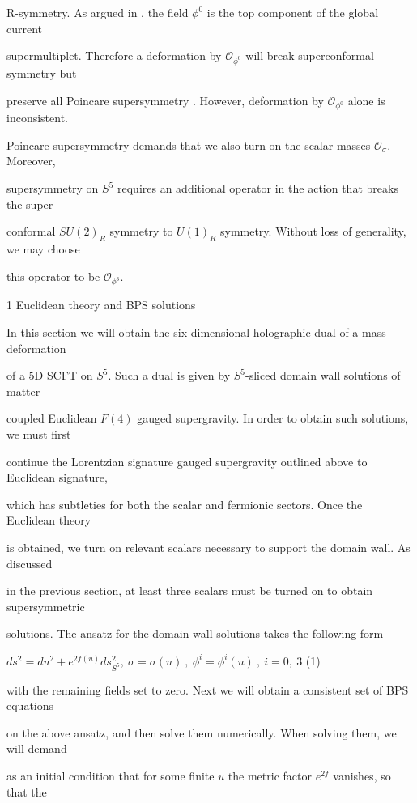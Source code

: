 \documentclass[a4paper,12pt]{article}
\begin{document}
$\mathrm{R}$-symmetry. As argued in , the field $\phi^{0}$ is the top component of the global current

supermultiplet. Therefore a deformation by $\mathcal{O}_{\phi^{0}}$ will break superconformal symmetry but

preserve all Poincare supersymmetry . However, deformation by $\mathcal{O}_{\phi^{0}}$ alone is inconsistent.

Poincare supersymmetry demands that we also turn on the scalar masses $\mathcal{O}_{\sigma}$. Moreover,

supersymmetry on $S^{5}$ requires an additional operator in the action that breaks the super-

conformal $SU(2)_{R}$ symmetry to $U(1)_{R}$ symmetry. Without loss of generality, we may choose

this operator to be $\mathcal{O}_{\phi^{3}}.$

1 Euclidean theory and BPS solutions

In this section we will obtain the six-dimensional holographic dual of a mass deformation

of a $5\mathrm{D}$ SCFT on $S^{5}$. Such a dual is given by $S^{5}$-sliced domain wall solutions of matter-

coupled Euclidean $F(4)$ gauged supergravity. In order to obtain such solutions, we must first

continue the Lorentzian signature gauged supergravity outlined above to Euclidean signature,

which has subtleties for both the scalar and fermionic sectors. Once the Euclidean theory

is obtained, we turn on relevant scalars necessary to support the domain wall. As discussed

in the previous section, at least three scalars must be turned on to obtain supersymmetric

solutions. The ansatz for the domain wall solutions takes the following form
\begin{center}
$ds^{2}=du^{2}+e^{2f(u)}ds_{S^{5}}^{2},\ \sigma=\sigma(u)\ ,\ \phi^{i}=\phi^{i}(u)\ ,\ i=0,\ 3$   (1)
\end{center}
with the remaining fields set to zero. Next we will obtain a consistent set of BPS equations

on the above ansatz, and then solve them numerically. When solving them, we will demand

as an initial condition that for some finite $u$ the metric factor $e^{2f}$ vanishes, so that the
\end{document}
